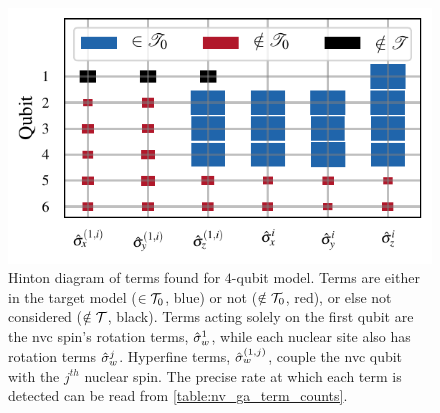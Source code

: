 \begin{figure}
    \begin{center}
        \includegraphics{experimental_study/figures/nv_gen_alg_hinton.pdf}
    \end{center}
    \caption[Hinton diagram of terms found for $4$-qubit  model]{
        Hinton diagram of terms found for $4$-qubit  model.
        Terms are either in the target model ($\in \mathcal{T}_0$, blue) or not ($\notin \mathcal{T}_0$, red), 
        or else not considered ($\notin \mathcal{T}$, black). 
        Terms acting solely on the first qubit are the \gls{nvc} spin's rotation terms, $\hat{\sigma}_w^1$,
            while each nuclear site also has rotation terms $\hat{\sigma}_w^j$.
            Hyperfine terms, $\hat{\sigma}_w^{(1,j)}$, couple the \gls{nvc} qubit with the $j^{th}$ nuclear spin. 
            The precise rate at which each term is detected can be read from \cref{table:nv_ga_term_counts}. 
        }
    \label{fig:nv_ga_hinton}
\end{figure}

\begin{table}
    \begin{center}
        
    \end{center}
    \caption[Percentage of \glspl{instance} for which each term is found by \gls{qmla} \gls{ga} studying \gls{nvc} system]{
        Percentage of \glspl{instance} for which each term is found by \gls{qmla} \gls{ga} studying \gls{nvc} system.
    }
    \label{table:nv_ga_term_counts}
\end{table}